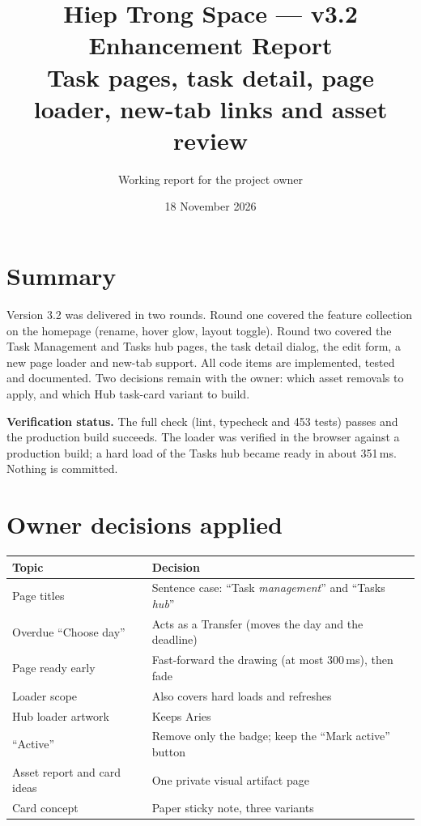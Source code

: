 \documentclass[11pt,a4paper]{article}
\title{\textbf{Hiep Trong Space --- v3.2 Enhancement Report}\\[0.3em]\large Task pages, task detail, page loader, new-tab links and asset review}
\author{Working report for the project owner}
\date{18 November 2026}
\begin{document}
\maketitle

\section{Summary}
Version 3.2 was delivered in two rounds. Round one covered the feature collection on the homepage (rename, hover glow, layout toggle). Round two covered the Task Management and Tasks hub pages, the task detail dialog, the edit form, a new page loader and new-tab support. All code items are implemented, tested and documented. Two decisions remain with the owner: which asset removals to apply, and which Hub task-card variant to build.

\textbf{Verification status.} The full check (lint, typecheck and 453 tests) passes and the production build succeeds. The loader was verified in the browser against a production build; a hard load of the Tasks hub became ready in about 351\,ms. Nothing is committed.

\section{Owner decisions applied}
\begin{tabular}{@{}p{4.5cm}p{10.3cm}@{}}
\toprule
Topic & Decision \\
\midrule
Page titles & Sentence case: ``Task \emph{management}'' and ``Tasks \emph{hub}'' \\
Overdue ``Choose day'' & Acts as a Transfer (moves the day and the deadline) \\
Page ready early & Fast-forward the drawing (at most 300\,ms), then fade \\
Loader scope & Also covers hard loads and refreshes \\
Hub loader artwork & Keeps Aries \\
``Active'' & Remove only the badge; keep the ``Mark active'' button \\
Asset report and card ideas & One private visual artifact page \\
Card concept & Paper sticky note, three variants \\
\bottomrule
\end{tabular}
\end{document}
